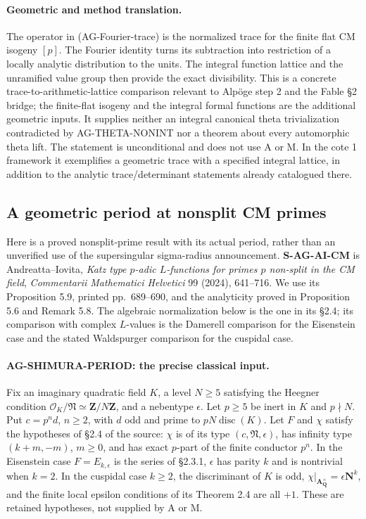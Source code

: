\paragraph{Geometric and method translation.}
The operator in (AG-Fourier-trace) is the normalized trace for the finite
flat CM isogeny $[p]$.  The Fourier identity turns its subtraction into
restriction of a locally analytic distribution to the units.  The
integral function lattice and the unramified value group then provide
the exact divisibility.  This is a concrete trace-to-arithmetic-lattice
comparison relevant to Alpöge step 2 and the Fable \S2 bridge; the
finite-flat isogeny and the integral formal functions are the additional
geometric inputs.  It supplies neither an integral canonical theta
trivialization contradicted by AG-THETA-NONINT nor a theorem about
every automorphic theta lift.  The statement is unconditional and
does not use A or M.  In the cote 1 framework it exemplifies a
geometric trace with a specified integral lattice, in addition to the
analytic trace/determinant statements already catalogued there.

\subsection{A geometric period at nonsplit CM primes}

Here is a proved nonsplit-prime result with its actual period, rather
than an unverified use of the supersingular sigma-radius announcement.
\textbf{S-AG-AI-CM} is Andreatta--Iovita, \emph{Katz type $p$-adic
$L$-functions for primes $p$ non-split in the CM field},
\emph{Commentarii Mathematici Helvetici} 99 (2024), 641--716.
We use its Proposition 5.9, printed pp.~689--690, and the analyticity
proved in Proposition 5.6 and Remark 5.8.  The algebraic normalization
below is the one in its \S2.4; its comparison with complex $L$-values
is the Damerell comparison for the Eisenstein case and the stated
Waldspurger comparison for the cuspidal case.

\paragraph{AG-SHIMURA-PERIOD: the precise classical input.}
Fix an imaginary quadratic field $K$, a level $N\geq5$ satisfying the
Heegner condition $\mathcal O_K/\mathfrak N\simeq\mathbf Z/N\mathbf Z$,
and a nebentype $\epsilon$.  Let $p\geq5$ be inert in $K$ and
$p\nmid N$.  Put $c=p^n d$, $n\geq2$, with $d$ odd and prime to
$pN\operatorname{disc}(K)$.  Let $F$ and $\chi$ satisfy the hypotheses
of \S2.4 of the source: $\chi$ is of its type $(c,\mathfrak N,\epsilon)$,
has infinity type $(k+m,-m)$, $m\geq0$, and has exact $p$-part of
the finite conductor $p^n$.  In the Eisenstein case $F=E_{k,\epsilon}$
is the series of \S2.3.1, $\epsilon$ has parity $k$ and is nontrivial
when $k=2$.  In the cuspidal case $k\geq2$, the discriminant of $K$
is odd, $\chi|_{\mathbf A_{\mathbf Q}^{\times}}=\epsilon\mathbf N^k$,
and the finite local epsilon conditions of its Theorem 2.4 are all
$+1$.  These are retained hypotheses, not supplied by A or M.

